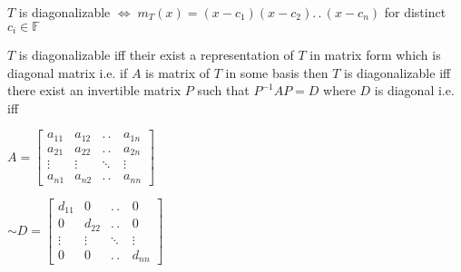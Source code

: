\documentclass[11pt]{extarticle}
\newcommand{\F}{\mathbb{F}}
\newcommand{\ck}{.\,.\,}
\newcommand{\tbx}[2][]{
	\begin{tcolorbox}[enhanced,breakable,size=small,colback=black!2!white,title={#1},arc is angular, arc=1.5mm,drop fuzzy shadow]
		#2
	\end{tcolorbox}
}
\begin{document}
\begin{multicols}{2}
{$ T $ is diagonalizable $ \iff \; m_T(x)=(x-c_1)(x-c_2)\ck(x-c_n) $ for distinct $ c_i\in \F $ }
\tbx[matrix representation]{
$ T $ is diagonalizable iff their exist a representation of $ T $ in matrix form which is diagonal matrix i.e.
if $ A $ is matrix of $ T $ in some basis then $ T $ is diagonalizable iff there exist an invertible matrix $ P $ such that $  P^{-1}  AP=D $ where $ D $ is diagonal i.e. iff 
\begin{flushleft}
	$ A=\begin{bmatrix}
		a_{11} & a_{12} & \ck & a_{1n}\\
		a_{21} & a_{22}& \ck & a_{2n}\\
		\vdots & \vdots & \ddots &\vdots\\
		a_{n1}& a_{n2}&\ck & a_{nn} 
	\end{bmatrix}  $
\end{flushleft}
\begin{flushright}
$ 
\sim D=
\begin{bmatrix}
	d_{11} & 0 & \ck & 0\\
	0& d_{22}& \ck & 0\\
	\vdots & \vdots & \ddots &\vdots\\
	0& 0&\ck & d_{nn} 
\end{bmatrix}  $
\end{flushright} }

\end{multicols}
\end{document}
